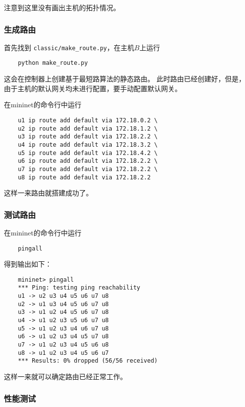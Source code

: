 

注意到这里没有画出主机的拓扑情况。

\subsubsection{生成路由}

首先找到 \texttt{classic/make\_route.py}，在主机$B$上运行

\begin{lstlisting}
	python make_route.py
\end{lstlisting}

这会在控制器上创建基于最短路算法的静态路由。
此时路由已经创建好，但是，由于主机的默认网关均未进行配置，要手动配置默认网关。

在mininet的命令行中运行

\begin{lstlisting}
	u1 ip route add default via 172.18.0.2 \
	u2 ip route add default via 172.18.1.2 \
	u3 ip route add default via 172.18.2.2 \
	u4 ip route add default via 172.18.3.2 \
	u5 ip route add default via 172.18.4.2 \
	u6 ip route add default via 172.18.2.2 \
	u7 ip route add default via 172.18.2.2 \
	u8 ip route add default via 172.18.2.2
\end{lstlisting}

这样一来路由就搭建成功了。

\subsubsection{测试路由}

在mininet的命令行中运行

\begin{lstlisting}
	pingall
\end{lstlisting}

得到输出如下：

\begin{lstlisting}
	mininet> pingall
	*** Ping: testing ping reachability
	u1 -> u2 u3 u4 u5 u6 u7 u8 
	u2 -> u1 u3 u4 u5 u6 u7 u8 
	u3 -> u1 u2 u4 u5 u6 u7 u8 
	u4 -> u1 u2 u3 u5 u6 u7 u8 
	u5 -> u1 u2 u3 u4 u6 u7 u8 
	u6 -> u1 u2 u3 u4 u5 u7 u8 
	u7 -> u1 u2 u3 u4 u5 u6 u8 
	u8 -> u1 u2 u3 u4 u5 u6 u7 
	*** Results: 0% dropped (56/56 received)
\end{lstlisting}

这样一来就可以确定路由已经正常工作。

\subsubsection{性能测试}

